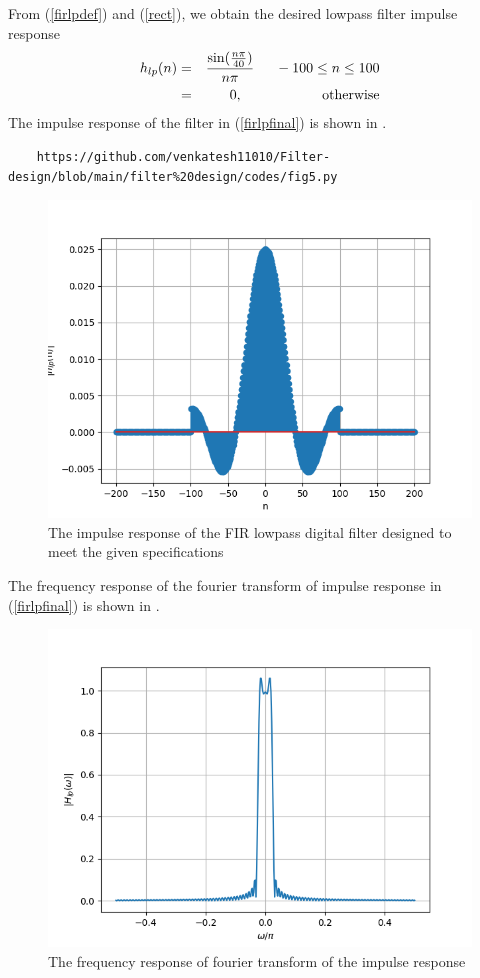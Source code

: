 \documentclass{article}
\begin{document}
From (\ref{firlpdef}) and (\ref{rect}), we obtain the desired lowpass filter impulse response
\begin{eqnarray}
\label{firlpfinal}
h_{lp}(n) &=& \frac{\sin(\frac{n\pi}{40})}{n\pi} \indent -100 \leq n \leq 100 \nonumber \\
&=& 0, \hspace{2cm} \mbox{otherwise}
\end{eqnarray}
The impulse  response of the filter in (\ref{firlpfinal}) is shown in .
\begin{lstlisting}
	https://github.com/venkatesh11010/Filter-design/blob/main/filter%20design/codes/fig5.py
\end{lstlisting}
\begin{figure}[H]
\includegraphics[width = \columnwidth]{figs/hlp.png}
\caption{The impulse response of the FIR lowpass digital filter designed to meet the given specifications} 
\label{fig6}
\end{figure}

The frequency response of the fourier transform of impulse response in (\ref{firlpfinal}) is shown in . 
\begin{figure}[H]
\includegraphics[width = \columnwidth]{figs/Hlp-real.png}
\caption{The frequency response of fourier transform of the impulse response}
\label{fig7}
\end{figure}
\end{document}
